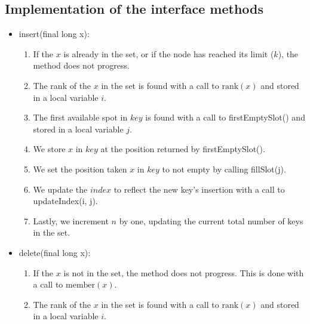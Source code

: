 \subsection{Implementation of the interface methods} \label{sec:binaryRankInterfaceImplementation}
\begin{itemize}
    \item \label{sec:binaryRankInsert}
    {\ttfamily insert(final long x)}:
    \begin{enumerate}
        \item
        If the $x$ is already in the set, or if the node has reached its limit ($k$), the method does not progress.
        
        \item
        The rank of the $x$ in the set is found with a call to  $\text{rank}(x)$ and stored in a local variable $i$.
        
        \item
        The first available spot in $key$ is found with a call to {\ttfamily firstEmptySlot()} and stored in a local variable $j$.
        
        \item
        We store $x$ in $key$ at the position returned by {\ttfamily firstEmptySlot()}.
        
        \item
        We set the position taken $x$ in $key$ to not empty by calling {\ttfamily fillSlot(j)}.
        
        \item
        We update the $index$ to reflect the new key's insertion with a call to {\ttfamily updateIndex(i, j)}.
        
        \item
        Lastly, we increment $n$ by one, updating the current total number of keys in the set.
    \end{enumerate}
    
    \item
    {\ttfamily delete(final long x)}:
    \begin{enumerate}
        \item
        If the $x$ is not in the set, the method does not progress. This is done with a call to $\text{member}(x)$.
        
        \item
        The rank of the $x$ in the set is found with a call to $\text{rank}(x)$ and stored in a local variable $i$.
        

\end{enumerate}
\end{itemize}
